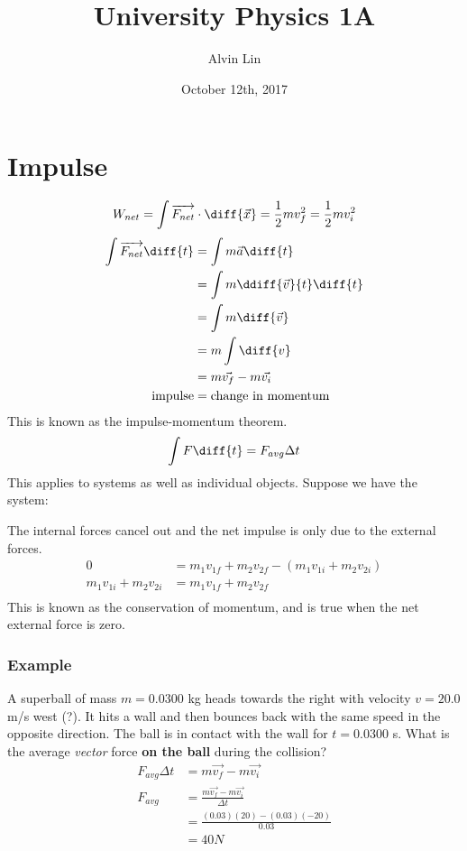 \documentclass[letterpaper, 12pt]{math}
\title{University Physics 1A}
\author{Alvin Lin}
\date{October 12th, 2017}
\begin{document}
\maketitle

\section*{Impulse}
\[ W_{net} = \int\overrightarrow{F_{net}}\cdot\diff{\vec{x}} =
  \frac{1}{2}mv_f^2 = \frac{1}{2}mv_i^2 \]
\begin{align*}
  \int\overrightarrow{F_{net}}\diff{t} &= \int m\vec{a}\diff{t} \\
  &= \int m\ddiff{\vec{v}}{t}\diff{t} \\
  &= \int m\diff{\vec{v}} \\
  &= m\int\diff{v} \\
  &= m\vec{v_f}-m\vec{v_i} \\
  \text{impulse} &= \text{change in momentum}
\end{align*}
This is known as the impulse-momentum theorem.
\[ \int F\diff{t} = F_{avg}\Delta{t} \]
This applies to systems as well as individual objects. Suppose we have the
system:
\begin{center}
\end{center}
The internal forces cancel out and the net impulse is only due to the external
forces.
\begin{align*}
  0 &= m_1v_{1f}+m_2v_{2f}-(m_1v_{1i}+m_2v_{2i}) \\
  m_1v_{1i}+m_2v_{2i} &= m_1v_{1f}+m_2v_{2f} \\
\end{align*}
This is known as the conservation of momentum, and is true when the net
external force is zero.

\subsubsection*{Example}
A superball of mass \( m = 0.0300 \) kg heads towards the right with velocity
\( v = 20.0 \) m/s west (?). It hits a wall and then bounces back with the same
speed in the opposite direction. The ball is in contact with the wall for
\( t = 0.0300 \) s. What is the average \textit{vector} force \textbf{on the
ball} during the collision?
\begin{align*}
  F_{avg}\Delta{t} &= m\vec{v_f}-m\vec{v_i} \\
  F_{avg} &= \frac{m\vec{v_f}-m\vec{v_i}}{\Delta{t}} \\
  &= \frac{(0.03)(20)-(0.03)(-20)}{0.03} \\
  &= 40N
\end{align*}
\end{document}
